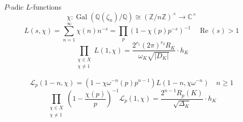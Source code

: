 \documentclass{beamer}
\newcommand {\tl}{\textlatin}
\newcommand{\Gal}{\operatorname{Gal}}
\newcommand{\Q}{\mathbb{Q}}
\newcommand{\Z}{\mathbb{Z}}
\newtheorem{thrm}{Θεώρημα}
\begin{document}
\begin{frame}
\begin{block}{$P$-\tl{adic} $L$-\tl{functions}}
$$\chi: \Gal(\mathbb{Q}(\zeta_n)/\Q) \cong (\Z/n\Z)^\times \longrightarrow \mathbb{C}^\times$$
$$L(s,\chi) = \sum\limits_{n=1}^\infty \chi(n)n^{-s} = \prod\limits_{p} (1-\chi(p)p^{-s})^{-1} \quad \operatorname{Re}(s)>1$$
$$\prod\limits_{\substack{\chi \in X \\ \chi \neq 1} } L(1,\chi) = \frac{2^{r_1} (2\pi)^{r_2} R_K}{\omega_K \sqrt{|D_K|}} \cdot h_K$$

$$\mathcal{L}_p (1-n,\chi) = (1-\chi\omega^{-n}(p)p^{n-1})L(1-n,\chi\omega^{-n}) \quad n\geq 1$$
$$\prod\limits_{\substack{\chi \in X \\ \chi \neq 1}} \left(1-\frac{\chi(p)}{p}\right)^{-1} \mathcal{L}_p(1,\chi) = \frac{2^{n-1}R_p(K)}{\sqrt{\Delta_K}} \cdot h_K$$
\end{block}
\end{frame}



 






\end{document}
